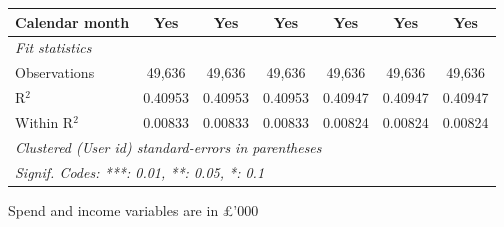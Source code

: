 \begin{table}[htbp]
\begin{threeparttable}[b]
\begin{tabular}{lcccccc}
         Calendar month      & Yes            & Yes            & Yes            & Yes            & Yes            & Yes\\  
         \midrule
         \emph{Fit statistics}\\
         Observations        & 49,636         & 49,636         & 49,636         & 49,636         & 49,636         & 49,636\\  
         R$^2$               & 0.40953        & 0.40953        & 0.40953        & 0.40947        & 0.40947        & 0.40947\\  
         Within R$^2$        & 0.00833        & 0.00833        & 0.00833        & 0.00824        & 0.00824        & 0.00824\\  
         \midrule \midrule
         \multicolumn{7}{l}{\emph{Clustered (User id) standard-errors in parentheses}}\\
         \multicolumn{7}{l}{\emph{Signif. Codes: ***: 0.01, **: 0.05, *: 0.1}}\\
      \end{tabular}
      
      \begin{tablenotes}\footnotesize
         \item Spend and income variables are in £'000
      \end{tablenotes}
   \end{threeparttable}
\end{table}


